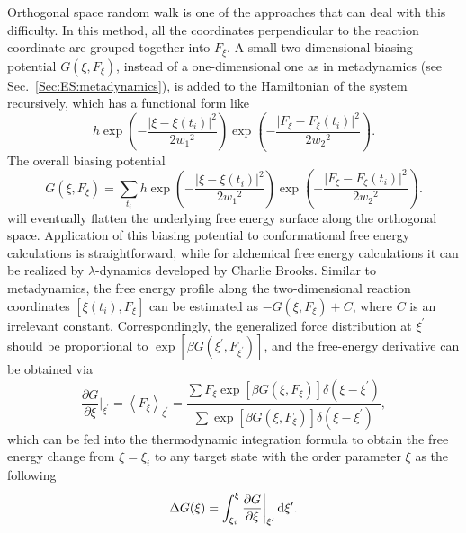 Orthogonal space random walk is one of the approaches that can deal with this difficulty. In this method, all the coordinates perpendicular to the reaction coordinate are grouped together into $F_{\xi}$. A small two dimensional biasing potential $G(\xi,F_{\xi})$, instead of a one-dimensional one as in metadynamics (see Sec.~\ref{Sec:ES:metadynamics}), is added to the Hamiltonian of the system recursively, which has a functional form like
\begin{equation}
   h\exp{\left(-\frac{\lvert\xi-\xi(t_i)\rvert^2}{2{w_1}^2}\right)}\exp{\left(-\frac{\lvert F_{\xi}-F_{\xi}(t_i)\rvert^2}{2{w_2}^2}\right)}.
\end{equation}
The overall biasing potential
\begin{equation}
G(\xi,F_\xi)=\sum\limits_{t_i}h\exp{\left(-\frac{\lvert\xi-\xi(t_i)\rvert^2}{2{w_1}^2}\right)}\exp{\left(-\frac{\lvert F_{\xi}-F_{\xi}(t_i)\rvert^2}{2{w_2}^2}\right)}.
\end{equation}
will eventually flatten the underlying free energy surface along the orthogonal space.
Application of this biasing potential to conformational free energy calculations is straightforward, while for alchemical free energy calculations it can be realized by $\lambda$-dynamics developed by Charlie Brooks.\cite{KongJCP1996} Similar to metadynamics, the free energy profile along the two-dimensional reaction coordinates $\left[\xi(t_i), F_\xi\right]$ can be estimated as $-G\left(\xi,F_{\xi}\right)+C$, where $C$ is an irrelevant constant. Correspondingly, the generalized force distribution at $\xi^\prime$ should be proportional to $\exp{\left[\beta G\left(\xi^\prime,F_{\xi^\prime}\right)\right]}$, and the free-energy derivative can be obtained via
\begin{equation}
	\frac{\partial G}{\partial \xi}\bigg\rvert_{\xi^\prime}=\left<F_\xi\right>_{\xi^\prime}=\frac{\sum F_\xi\exp{\left[\beta G(\xi,F_\xi)\right]}\delta(\xi-\xi^\prime)}{\sum\exp{\left[\beta G(\xi,F_\xi)\right]}\delta(\xi-\xi^\prime)},
\end{equation}
which can be fed into the thermodynamic integration formula to obtain the free energy change from $\xi=\xi_i$ to any target state with the order parameter $\xi$ as the following
\begin{equation}
	\Delta G(\xi) = \int_{\xi_i}^{\xi}\frac{\partial G}{\partial \xi}\bigg\rvert_{\xi^\prime}\mathop{}\!\mathrm{d}\xi^\prime.
\end{equation}